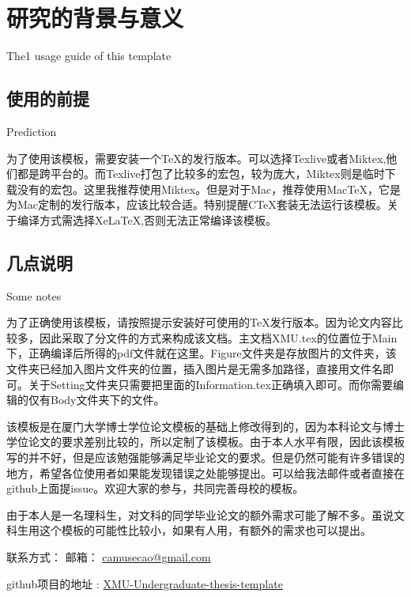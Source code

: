 \chapter{研究的背景与意义}{The1 usage guide of this template}

\section{使用的前提}{Prediction}

为了使用该模板，需要安装一个TeX的发行版本。可以选择Texlive或者Miktex,他们都是跨平台的。而Texlive打包了比较多的宏包，较为庞大，Miktex则是临时下载没有的宏包。这里我推荐使用Miktex。但是对于Mac，推荐使用MacTeX，它是为Mac定制的发行版本，应该比较合适。特别提醒CTeX套装无法运行该模板。关于编译方式需选择XeLaTeX,否则无法正常编译该模板。


\section{几点说明}{Some notes}

为了正确使用该模板，请按照提示安装好可使用的TeX发行版本。因为论文内容比较多，因此采取了分文件的方式来构成该文档。主文档XMU.tex的位置位于Main下，正确编译后所得的pdf文件就在这里。Figure文件夹是存放图片的文件夹，该文件夹已经加入图片文件夹的位置，插入图片是无需多加路径，直接用文件名即可。关于Setting文件夹只需要把里面的Information.tex正确填入即可。而你需要编辑的仅有Body文件夹下的文件。

该模板是在厦门大学博士学位论文模板的基础上修改得到的，因为本科论文与博士学位论文的要求差别比较的，所以定制了该模板。由于本人水平有限，因此该模板写的并不好，但是应该勉强能够满足毕业论文的要求。但是仍然可能有许多错误的地方，希望各位使用者如果能发现错误之处能够提出。可以给我法邮件或者直接在github上面提issue。欢迎大家的参与，共同完善母校的模板。

由于本人是一名理科生，对文科的同学毕业论文的额外需求可能了解不多。虽说文科生用这个模板的可能性比较小，如果有人用，有额外的需求也可以提出。

联系方式：
邮箱： \href{mailto:camusecao@gmail.com}{camusecao@gmail.com}

github项目的地址 : \href{https://github.com/CamuseCao/XMU-Undergraduate-thesis-template}{XMU-Undergraduate-thesis-template}
